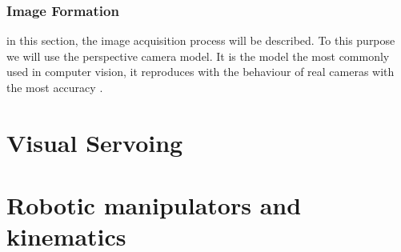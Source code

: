 \subsubsection{Image Formation}

in this section, the image acquisition process will be described. To this purpose we will use the perspective camera model. It is the model the most commonly used in computer vision, it reproduces with the behaviour of real cameras with the most accuracy \cite{Szeliski:2010:CVA:1941882}.

\section{Visual Servoing}
\label{Visual_Servoing}

\section{Robotic manipulators and kinematics}
\label{Robotic_manipulator}


